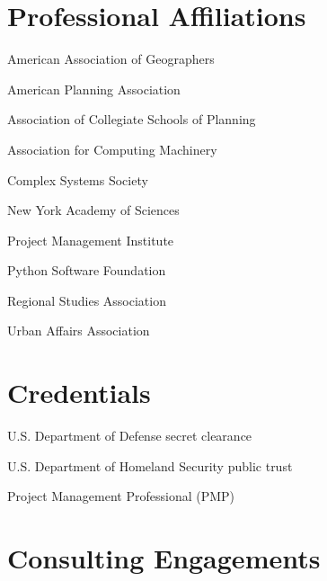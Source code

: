 \documentclass[12pt,letterpaper]{report}
\newcommand{\listitemspace}{0.15em}
\renewenvironment{itemize}
{\begin{list}{}{\setlength{\leftmargin}{0em}
			\setlength{\parskip}{0em}
			\setlength{\itemsep}{\listitemspace}
			\setlength{\parsep}{\listitemspace}}}
	{\end{list}}
\begin{document}
	\section*{Professional Affiliations}

	\begin{itemize}

		\item American Association of Geographers

		\item American Planning Association

		\item Association of Collegiate Schools of Planning

		\item Association for Computing Machinery

		\item Complex Systems Society

		\item New York Academy of Sciences

		\item Project Management Institute

		\item Python Software Foundation
		
		\item Regional Studies Association

		\item Urban Affairs Association

	\end{itemize}



	\section*{Credentials}

	\begin{itemize}

		\item U.S. Department of Defense secret clearance

		\item U.S. Department of Homeland Security public trust

		\item Project Management Professional (PMP)

	\end{itemize}



	\section*{Consulting Engagements}
\end{document}

